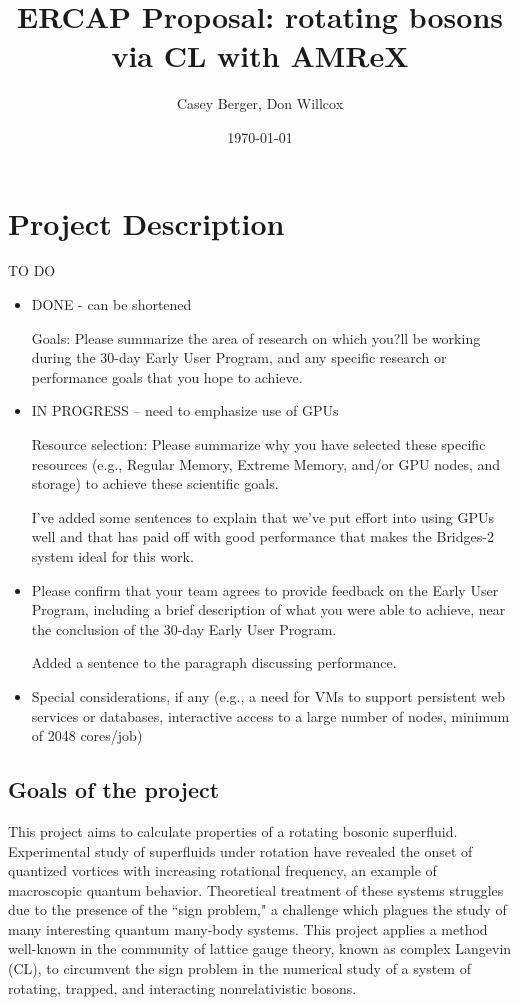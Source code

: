 \documentclass[onecolumn, 12pt]{article}
\title{ERCAP Proposal: rotating bosons via CL with AMReX}
\author{Casey Berger, Don Willcox}
\date{\today}
\begin{document}
\section{Project Description}
TO DO
\begin{itemize} 
	\item DONE  - can be shortened
	
	Goals: Please summarize the area of research on which you?ll be working during the 30-day Early User Program, and any specific research or performance goals that you hope to achieve.
	
	\item IN PROGRESS -- need to emphasize use of GPUs
	
	Resource selection: Please summarize why you have selected these specific resources (e.g., Regular Memory, Extreme Memory, and/or GPU nodes, and storage) to achieve these scientific goals.

    {\color{blue} I've added some sentences to explain that we've put effort into using GPUs well and that has paid off with good performance that makes the Bridges-2 system ideal for this work.}
	
	\item Please confirm that your team agrees to provide feedback on the Early User Program, including a brief description of what you were able to achieve, near the conclusion of the 30-day Early User Program.

	{\color{blue} Added a sentence to the paragraph discussing performance.}
	
	\item Special considerations, if any (e.g., a need for VMs to support persistent web services or databases, interactive access to a large number of nodes, minimum of 2048 cores/job)
\end{itemize}
\subsection{Goals of the project}
This project aims to calculate properties of a rotating bosonic superfluid. Experimental study of superfluids under rotation have revealed the onset of quantized vortices with increasing rotational frequency, an example of macroscopic quantum behavior. Theoretical treatment of these systems struggles due to the presence of the ``sign problem," a challenge which plagues the study of many interesting quantum many-body systems. This project applies a method well-known in the community of lattice gauge theory, known as complex Langevin (CL), to circumvent the sign problem in the numerical study of a system of rotating, trapped, and interacting nonrelativistic bosons. 
\end{document}
